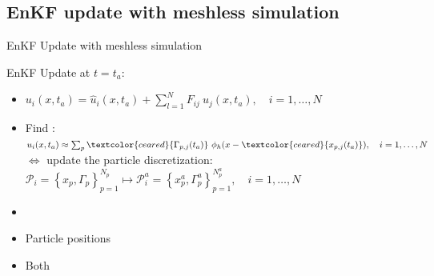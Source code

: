 \documentclass[aspectratio=169]{beamer} %
\begin{document}
\subsection{EnKF update with meshless simulation}
\begin{frame}{EnKF Update with meshless simulation}
    \begin{block}{EnKF Update at $t=t_a$:}
        \begin{itemize}
            \item \normalsize $u_i(x, t_a) = \hat u_i(x, t_a) + \sum_{l=1}^{N} F_{ij}~\hat u_j(x, t_a), \quad i = 1, \dots, N$ \\
            \item<2-> \normalsize Find : $u_i(x, t_a) \approx \sum_p \textcolor{ceared}{\Gamma_{p, j}(t_a)}~\phi_h (x - \textcolor{ceared}{x_{p, j}(t_a)}), \quad i = 1, \dots, N$\\
                $\Leftrightarrow$ update the particle discretization: $\mathcal P_i = \left\{x_p, \Gamma_p\right\}_{p=1}^{N_p} \mapsto \mathcal P_i^a = \left\{x_p^a, \Gamma^a_p\right\}_{p=1}^{N^a_p}, \quad i = 1, \dots, N$
        \end{itemize}
    \end{block}
    \vfill

    \begin{itemize}
        \item<3->   
        \item<3-> Particle positions
        \item<3-> Both
    \end{itemize}
\end{frame}
\end{document}
